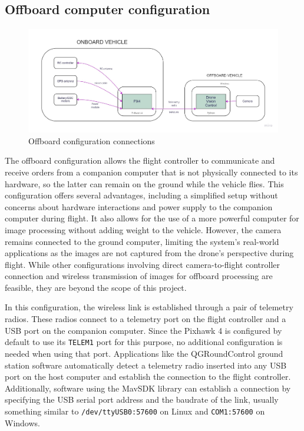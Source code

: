 \subsection{Offboard computer configuration}
\label{subsec:offboard}

\begin{figure}
  \centering
  \includegraphics[width=\textwidth,keepaspectratio]{img/offboard-diagram.jpg}
  \caption{Offboard configuration connections}
  \label{fig:offboard-config}
\end{figure}

The offboard configuration allows the flight controller to communicate and receive orders from a companion computer that is not physically connected to its hardware, so the latter can remain on the ground while the vehicle flies.
This configuration offers several advantages, including a simplified setup without concerns about hardware interactions and power supply to the companion computer during flight. It also allows for the use of a more powerful computer for image processing without adding weight to the vehicle. However, the camera remains connected to the ground computer, limiting the system's real-world applications as the images are not captured from the drone's perspective during flight. While other configurations involving direct camera-to-flight controller connection and wireless transmission of images for offboard processing are feasible, they are beyond the scope of this project.

In this configuration, the wireless link is established through a pair of telemetry radios.
These radios connect to a telemetry port on the flight controller and a USB port on the companion computer. 
Since the Pixhawk 4 is configured by default to use its \texttt{TELEM1} port for this purpose, no additional configuration is needed when using that port.
Applications like the QGRoundControl ground station software automatically detect a telemetry radio inserted into any USB port on the host computer and establish the connection to the flight controller.
Additionally, software using the MavSDK library can establish a connection by specifying the USB serial port address and the baudrate of the link, usually something similar to \texttt{/dev/ttyUSB0:57600} on Linux and \texttt{COM1:57600} on Windows.

